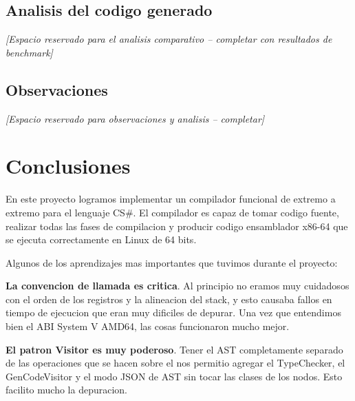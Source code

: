\documentclass[12pt, a4paper]{article}
\begin{document}
\subsection{Analisis del codigo generado}


\vspace{3cm}
\textit{[Espacio reservado para el analisis comparativo -- completar con resultados de benchmark]}
\vspace{3cm}

\subsection{Observaciones}


\vspace{3cm}
\textit{[Espacio reservado para observaciones y analisis -- completar]}
\vspace{3cm}

\newpage

\section{Conclusiones}

En este proyecto logramos implementar un compilador funcional de extremo a extremo para el lenguaje CS\#. El compilador es capaz de tomar codigo fuente, realizar todas las fases de compilacion y producir codigo ensamblador x86-64 que se ejecuta correctamente en Linux de 64 bits.

Algunos de los aprendizajes mas importantes que tuvimos durante el proyecto:

\textbf{La convencion de llamada es critica}. Al principio no eramos muy cuidadosos con el orden de los registros y la alineacion del stack, y esto causaba fallos en tiempo de ejecucion que eran muy dificiles de depurar. Una vez que entendimos bien el ABI System V AMD64, las cosas funcionaron mucho mejor.

\textbf{El patron Visitor es muy poderoso}. Tener el AST completamente separado de las operaciones que se hacen sobre el nos permitio agregar el TypeChecker, el GenCodeVisitor y el modo JSON de AST sin tocar las clases de los nodos. Esto facilito mucho la depuracion.
\end{document}
